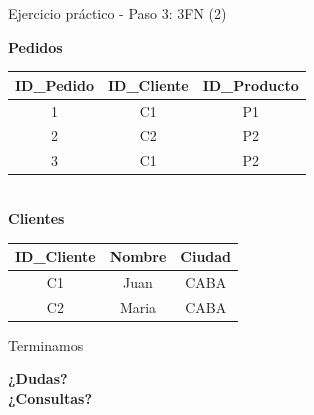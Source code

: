 \documentclass{beamer}
\begin{document}
\begin{frame}{Ejercicio práctico - Paso 3: 3FN (2)}
    \small
    \begin{center}
    \textbf{Pedidos}\\[0.1cm]
    \begin{tabular}{ccc}
        \hline
        ID\_Pedido & ID\_Cliente & ID\_Producto \\
        \hline
        1 & C1 & P1 \\
        2 & C2 & P2 \\
        3 & C1 & P2 \\
        \hline
    \end{tabular}
    \vspace{0.6cm}
    \textbf{\\Clientes}\\[0.1cm]
    \begin{tabular}{ccc}
        \hline
        ID\_Cliente & Nombre & Ciudad \\
        \hline
        C1 & Juan & CABA \\
        C2 & Maria & CABA \\
        \hline
    \end{tabular}
    \end{center}
\end{frame}

\begin{frame}{Terminamos}
    \begin{center}
        \Large{\textbf{¿Dudas?\\¿Consultas?}}
    \end{center}
\end{frame}
\end{document}
